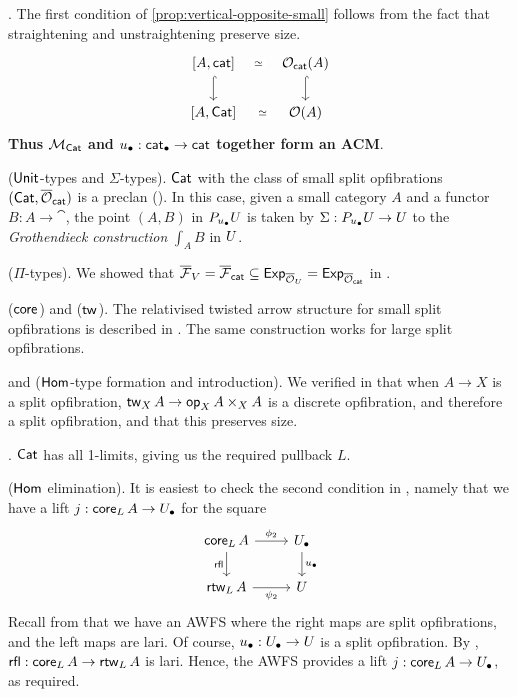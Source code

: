 \begin{example}
  .
  The first condition of \cref{prop:vertical-opposite-small} follows from
  the fact that straightening and unstraightening preserve size.
  \[
  \begin{tikzcd}
    {[A,\cat]} & {\smlopfibcart(A)} \\
    {[A,\Cat]} & {\opfibcart(A)}
    \arrow["\simeq"{description}, draw=none, from=1-1, to=1-2]
    \arrow[hook, from=1-1, to=2-1]
    \arrow[hook, from=1-2, to=2-2]
    \arrow["\simeq"{description}, draw=none, from=2-1, to=2-2]
  \end{tikzcd} 
  \]
  {\bf Thus $\MM_\Cat$ and $\ulow : \pcat \to \cat$ together form an ACM}.
  
   ($\Unit$-types and $\Sigma$-types).
  $\Cat$ with the class of small split opfibrations
  $(\Cat,\smlopfib)$
  is a preclan ().
  In this case, given a small category $A$ and a functor $B : A \to \cat$,
  the point $(A,B)$ in $P_{\ulow} \U$ is taken by
  $\Sigma : P_{\ulow} \U \to \U$
  to the \emph{Grothendieck construction} $\int_A B$ in $\U$.

   ($\Pi$-types).
  We showed that $\fib_V = \smlfib \subseteq \Exp_{\opfib_\U} = \Exp_{\smlopfib}$
  in .  
 
   ($\vCore$) and  ($\vTw$).
  The relativised twisted arrow structure for small split opfibrations
  is described in .
  The same construction works for large split opfibrations.

   and 
  ($\Hom$-type formation and introduction).
  We verified in 
  that when $A \to X$ is a split opfibration,
  $\vTw[X] A \to \vOp[X] A \times_X A$ is a discrete opfibration,
  and therefore a split opfibration,
  and that this preserves size.

  .
  $\Cat$ has all 1-limits, giving us the required pullback $L$.

   ($\Hom$ elimination).
  It is easiest to check the second condition in
  ,
  namely that we have a lift $j : {\vCore[L]{A}} \to \Ulow$
  for the square
  \[\begin{tikzcd}
      {\vCore[L]{A}} & \Ulow \\
      {\rtw[L]{A}} & \U
      \arrow["{{\phi_2}}", from=1-1, to=1-2]
      \arrow["{{\rfl}}"', from=1-1, to=2-1]
      \arrow["\ulow", from=1-2, to=2-2]
      \arrow["{{\psi_2}}"', from=2-1, to=2-2]
    \end{tikzcd}\]
  Recall from  that
  we have an AWFS where the
  right maps are split opfibrations, and the left maps are lari.
  Of course, $\ulow : \Ulow \to \U$ is a split opfibration.
  By ,
  ${\rfl} : {\vCore[L]{A}} \to {\rtw[L]{A}}$ is lari.
  Hence, the AWFS provides a lift $j : {\vCore[L]{A}} \to \Ulow$, as required.


\end{example}
